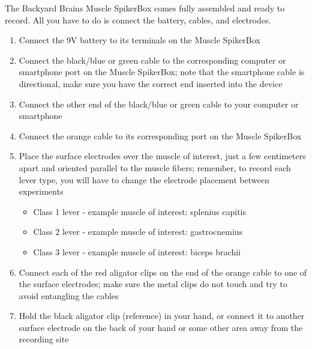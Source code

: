 \documentclass[12pt]{article}
\begin{document}
The Backyard Brains Muscle SpikerBox comes fully assembled and ready to record. All you have to do is connect the battery, cables, and electrodes.

\vspace{0.2cm}

\begin{enumerate}
\item Connect the 9V battery to its terminals on the Muscle SpikerBox
\item Connect the black/blue or green cable to the corresponding computer or smartphone port on the Muscle SpikerBox; note that the smartphone cable is directional, make sure you have the correct end inserted into the device
\item Connect the other end of the black/blue or green cable to your computer or smartphone
\item Connect the orange cable to its corresponding port on the Muscle SpikerBox
\item Place the surface electrodes over the muscle of interest, just a few centimeters apart and oriented parallel to the muscle fibers; remember, to record each lever type, you will have to change the electrode placement between experiments
\begin{itemize}
\item Class 1 lever - example muscle of interest: splenius capitis
\item Class 2 lever - example muscle of interest: gastrocnemius
\item Class 3 lever - example muscle of interest: biceps brachii
\end{itemize}
\item Connect each of the red aligator clips on the end of the orange cable to one of the surface electrodes; make sure the metal clips do not touch and try to avoid entangling the cables 
\item Hold the black aligator clip (reference) in your hand, or connect it to another surface electrode on the back of your hand or some other area away from the recording site

\vspace{0.2cm}


\end{enumerate}
\end{document}
